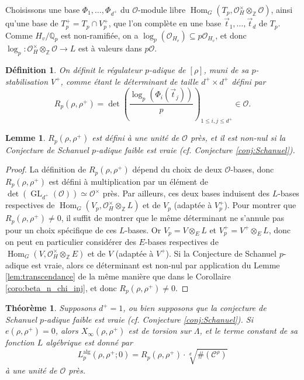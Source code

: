 \documentclass[12pt]{amsart}
\newcommand\bZ{\mathbb{Z}}
\newcommand\Qp{\mathbb{Q}_{p}}
\newcommand\cC{\mathcal{C}}
\newcommand\cO{\mathcal{O}}
\newcommand{\alg}{\textrm{alg}}
\DeclareMathOperator{\Hom}{Hom}
\DeclareMathOperator{\GL}{GL}
\theoremstyle{defstyle}
\newtheorem{definition}[subsubsection]{Définition}
\theoremstyle{thmstyle}
\newtheorem{theorem}[subsubsection]{Théorème}
\newtheorem{lemme}[subsubsection]{Lemme}
\begin{document}
Choisissons une base $\Phi_1,\ldots,\Phi_{d^+}$ du $\cO$-module libre $\Hom_G(T_p,\cO_H^\times \otimes_\bZ \cO)$, ainsi qu'une base de $T_p^+=T_p\cap V_p^+$, que l'on complète en une base $\vec{t}_1,\ldots,\vec{t}_d$ de $T_p$. Comme $H_v/\Qp$ est non-ramifiée, on a $\log_p(\cO_{H_v}) \subseteq p\cO_{H_v}$, et donc $\log_p : \cO_H^\times \otimes_\bZ \cO \longrightarrow L$ est à valeurs dans $p\cO$. 
\begin{definition}
	On définit le régulateur $p$-adique de $[\rho]$, muni de sa $p$-stabilisation $V^+$, comme étant le déterminant de taille $d^+\times d^+$ défini par
	$$R_p(\rho,\rho^+)= \det\left(\frac{\log_p\left(\Phi_i(\vec{t}_j)\right)}{p}\right)_{1\leq i,j\leq d^+} \in \cO.$$
\end{definition}

\begin{lemme}\label{lem:non_annulation_reg}
	$R_p(\rho,\rho^+)$ est défini à une unité de $\cO$ près, et il est non-nul si la Conjecture de Schanuel $p$-adique faible est vraie (cf. Conjecture \ref{conj:Schanuel}).
\end{lemme}
\begin{proof}
	La définition de $R_p(\rho,\rho^+)$ dépend du choix de deux $\cO$-bases, donc $R_p(\rho,\rho^+)$ est défini à multiplication par un élément de $\det (\GL_{d^+}(\cO))\simeq \cO^\times$ près. Par ailleurs, ces deux bases induisent des $L$-bases respectives de $\Hom_G(V_p,\cO_H^\times \otimes_\bZ L)$ et de $V_p$ (adaptée à $V_p^+$). Pour montrer que $R_p(\rho,\rho^+)\neq 0$, il suffit de montrer que le même déterminant ne s'annule pas pour un choix spécifique de ces $L$-bases. Or $V_p=V \otimes_E L$ et $V_p^+=V^+ \otimes_E L$, donc on peut en particulier considérer des $E$-bases respectives de $\Hom_G(V,\cO_H^\times \otimes_\bZ E)$ et de $V$ (adaptée à $V^+$). Si la Conjecture de Schanuel $p$-adique est vraie, alors ce déterminant est non-nul par application du Lemme \ref{lem:transcendance} de la même manière que dans le Corollaire \ref{coro:beta_n_chi_inj}, et donc  $R_p(\rho,\rho^+)\neq 0$.
\end{proof}

\begin{theorem}\label{th:terme_cst_dim_d}
	Supposons $d^+=1$, ou bien supposons que la conjecture de Schanuel $p$-adique faible est vraie (cf. Conjecture \ref{conj:Schanuel}). Si $e(\rho,\rho^+)=0$, alors $X_\infty(\rho,\rho^+)$ est de torsion sur $\Lambda$, et le terme constant de sa fonction $L$ algébrique est donné par 
	$$L_p^{\alg}(\rho,\rho^+;0) = R_p(\rho,\rho^+) \cdot \sqrt[d]{\#\left(\cC^\rho\right)}$$
	à une unité de $\cO$ près.
\end{theorem}
\end{document}
